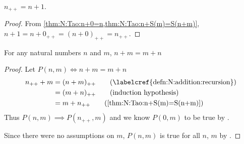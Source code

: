 \begin{cor} \label{thm:N:Tao:S(n)=n+1}
    $n_{++} = n + 1$.
\end{cor}

\begin{proof}
    From \cref{thm:N:Tao:n+0=n,thm:N:Tao:n+S(m)=S(n+m)}, $n + 1 = n + 0_{++} = (n + 0)_{++} = n_{++}$.
\end{proof}

\begin{prop} \label{thm:N:Tao:addition_is_commutative}
For any natural numbers $n$ and $m$, $n + m = m + n$
\end{prop}

\begin{proof}
    Let $P(n, m) \iff n + m = m + n$
    \begin{align*}
        n_{++} + m &= (n + m)_{++} \tag{\labelcref{defn:N:addition:recursion}} \\
                   &= (m + n)_{++} \tag{induction hypothesis} \\
                   &= m + n_{++}   \tag{\cref{thm:N:Tao:n+S(m)=S(n+m)}}
    \end{align*}
    Thus $P(n, m) \implies P(n_{++}, m)$ and we know $P(0, m)$ to be true by .

    Since there were no assumptions on $m$, $P(n, m)$ is true for all $n$, $m$ by .
\end{proof}

